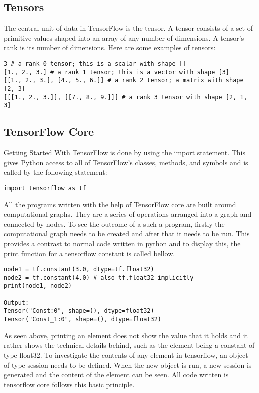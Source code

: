 \subsection{Tensors}
The central unit of data in TensorFlow is the tensor. 
A tensor consists of a set of primitive values shaped into an array of any number of dimensions. 
A tensor's rank is its number of dimensions. 
Here are some examples of tensors:

\begin{adjustbox}{width=\textwidth}
\begin{lstlisting}
3 # a rank 0 tensor; this is a scalar with shape []
[1., 2., 3.] # a rank 1 tensor; this is a vector with shape [3]
[[1., 2., 3.], [4., 5., 6.]] # a rank 2 tensor; a matrix with shape [2, 3]
[[[1., 2., 3.]], [[7., 8., 9.]]] # a rank 3 tensor with shape [2, 1, 3]
\end{lstlisting} 
\end{adjustbox}


\subsection{TensorFlow Core}
Getting Started With TensorFlow is done by using the import statement. 
This gives Python access to all of TensorFlow's classes,
methods, and symbols and is called by the following statement:

\begin{lstlisting}
import tensorflow as tf
\end{lstlisting}

All the programs written with the help of TensorFlow core are built around computational graphs. 
They are a series of operations arranged into a graph and connected by nodes. 
To see the outcome of a such a program, 
firstly the computational graph needs to be created and after that it needs to be run. 
This provides a contrast to normal code written in python and to display this, 
the print function for a tensorflow constant is called bellow.

\begin{lstlisting}
node1 = tf.constant(3.0, dtype=tf.float32)
node2 = tf.constant(4.0) # also tf.float32 implicitly
print(node1, node2)

Output:
Tensor("Const:0", shape=(), dtype=float32)
Tensor("Const_1:0", shape=(), dtype=float32) 
\end{lstlisting}

As seen above, printing an element does not show the value that it holds and it rather shows the technical details behind,
such as the element being a constant of type float32.
To investigate the contents of any element in tensorflow,
an object of type session needs to be defined.
When the new object is run, a new session is generated and the content of the element can be seen.
All code written is tensorflow core follows this basic principle.

